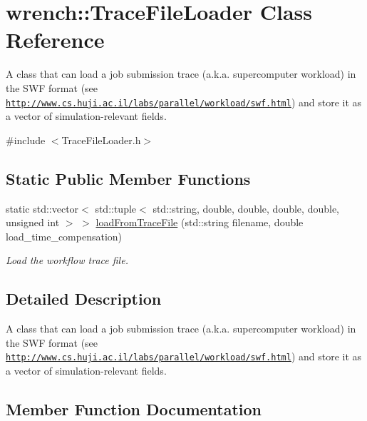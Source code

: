 \hypertarget{classwrench_1_1_trace_file_loader}{}\section{wrench\+:\+:Trace\+File\+Loader Class Reference}
\label{classwrench_1_1_trace_file_loader}


A class that can load a job submission trace (a.\+k.\+a. supercomputer workload) in the S\+WF format (see \href{http://www.cs.huji.ac.il/labs/parallel/workload/swf.html}{\tt http\+://www.\+cs.\+huji.\+ac.\+il/labs/parallel/workload/swf.\+html}) and store it as a vector of simulation-\/relevant fields.  




{\ttfamily \#include $<$Trace\+File\+Loader.\+h$>$}

\subsection*{Static Public Member Functions}
\begin{DoxyCompactItemize}
\item 
static std\+::vector$<$ std\+::tuple$<$ std\+::string, double, double, double, double, unsigned int $>$ $>$ \hyperlink{classwrench_1_1_trace_file_loader_a8e6e95774cf02ed1968521d473cdf6cb}{load\+From\+Trace\+File} (std\+::string filename, double load\+\_\+time\+\_\+compensation)
\begin{DoxyCompactList}\small\item\em Load the workflow trace file. \end{DoxyCompactList}\end{DoxyCompactItemize}


\subsection{Detailed Description}
A class that can load a job submission trace (a.\+k.\+a. supercomputer workload) in the S\+WF format (see \href{http://www.cs.huji.ac.il/labs/parallel/workload/swf.html}{\tt http\+://www.\+cs.\+huji.\+ac.\+il/labs/parallel/workload/swf.\+html}) and store it as a vector of simulation-\/relevant fields. 

\subsection{Member Function Documentation}
\mbox{\label{classwrench_1_1_trace_file_loader_a8e6e95774cf02ed1968521d473cdf6cb}} 
